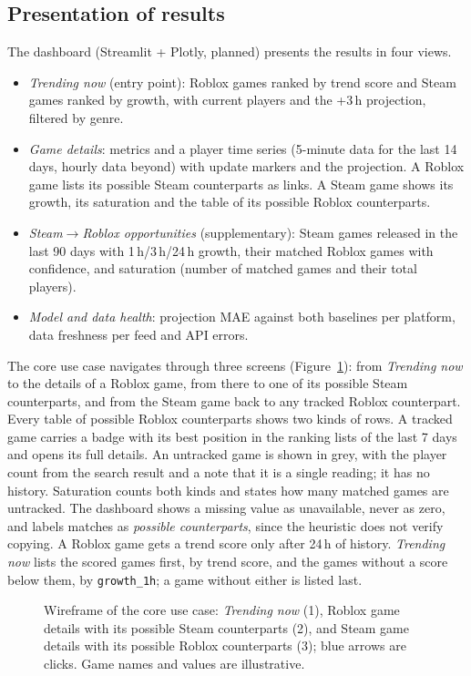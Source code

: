 \documentclass[10pt,a4paper]{article}
\newcommand{\ep}[1]{\texttt{\small #1}}
\begin{document}
\subsection{Presentation of results}\label{sec:presentation}
The dashboard (Streamlit + Plotly, planned) presents the results in four views.
\begin{itemize}
  \item \emph{Trending now} (entry point): Roblox games ranked by trend score and Steam games ranked by growth, with current players and the +3\,h projection, filtered by genre.
  \item \emph{Game details}: metrics and a player time series (5-minute data for the last 14 days, hourly data beyond) with update markers and the projection. A Roblox game lists its possible Steam counterparts as links. A Steam game shows its growth, its saturation and the table of its possible Roblox counterparts.
  \item \emph{Steam$\rightarrow$Roblox opportunities} (supplementary): Steam games released in the last 90 days with 1\,h/3\,h/24\,h growth, their matched Roblox games with confidence, and saturation (number of matched games and their total players).
  \item \emph{Model and data health}: projection MAE against both baselines per platform, data freshness per feed and API errors.
\end{itemize}
The core use case navigates through three screens (Figure~\ref{fig:wire}): from \emph{Trending now} to the details of a Roblox game, from there to one of its possible Steam counterparts, and from the Steam game back to any tracked Roblox counterpart. Every table of possible Roblox counterparts shows two kinds of rows. A tracked game carries a badge with its best position in the ranking lists of the last 7 days and opens its full details. An untracked game is shown in grey, with the player count from the search result and a note that it is a single reading; it has no history. Saturation counts both kinds and states how many matched games are untracked. The dashboard shows a missing value as unavailable, never as zero, and labels matches as \emph{possible counterparts}, since the heuristic does not verify copying. A Roblox game gets a trend score only after 24\,h of history. \emph{Trending now} lists the scored games first, by trend score, and the games without a score below them, by \ep{growth\_1h}; a game without either is listed last.

\begin{figure}[H]
\centering
\resizebox{\textwidth}{!}{}
\caption{Wireframe of the core use case: \emph{Trending now} (1), Roblox game details with its possible Steam counterparts (2), and Steam game details with its possible Roblox counterparts (3); blue arrows are clicks. Game names and values are illustrative.}
\label{fig:wire}
\end{figure}
\end{document}
